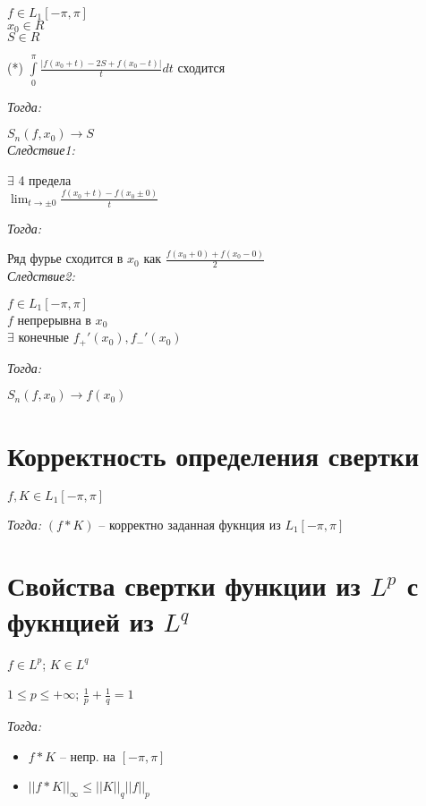 \documentclass[paper=a4, fontsize=14pt]{report}
\begin{document}
    $ f \in L_1[-\pi, \pi] $\\
    $ x_0 \in R $\\
    $ S \in R $

    (*) $ \int\limits_{0}^{\pi} \frac{|f(x_0 + t) - 2S + f(x_0 - t)|}{t} dt $ сходится

    \emph{Тогда:}

    $ S_n(f, x_0) \to S $\\

    \emph{Следствие1:}

    $ \exists $ 4 предела\\
    $ \lim_{t \to \pm 0} \frac{f(x_0 + t) - f(x_0 \pm 0)}{t} $

    \emph{Тогда:}

    Ряд фурье сходится в $ x_0 $ как $ \frac{f(x_0 + 0) + f(x_0 - 0)}{2} $\\

    \emph{Следствие2:}

    $ f \in L_1[-\pi, \pi] $\\
    $ f $ непрерывна в  $ x_0 $\\
    $ \exists $ конечные $ f_{+}'(x_0), f_{-}'(x_0) $

    \emph{Тогда:}

    $ S_n(f, x_0) \to f(x_0) $

    \section{Корректность определения свертки}

    $ f, K \in L_1[-\pi, \pi] $

    \emph{Тогда:} $ (f * K)$ -- корректно заданная фукнция из $ L_1[-\pi, \pi] $

    \section{Свойства свертки функции из $ L^p $ с фукнцией из $ L^q $}

    $ f \in L^p $; $ K \in L^q $

    $ 1 \leqslant p \leqslant +\infty $; $ \frac{1}{p} + \frac{1}{q} = 1 $

    \emph{Тогда:}
    \begin{itemize}
        \item $ f \ast K $ -- непр. на $ [-\pi, \pi] $
        \item $ ||f \ast K||_{\infty} \leqslant ||K||_q ||f||_p $
    \end{itemize}
\end{document}
